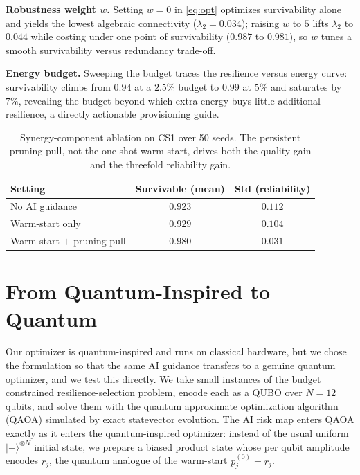 \documentclass[journal]{IEEEtran}
\begin{document}
\noindent\textbf{Robustness weight $w$.} Setting $w=0$ in \eqref{eq:opt} optimizes survivability alone and yields the lowest algebraic connectivity ($\lambda_2=0.034$); raising $w$ to $5$ lifts $\lambda_2$ to $0.044$ while costing under one point of survivability ($0.987$ to $0.981$), so $w$ tunes a smooth survivability versus redundancy trade-off.

\noindent\textbf{Energy budget.} Sweeping the budget traces the resilience versus energy curve: survivability climbs from $0.94$ at a $2.5\%$ budget to $0.99$ at $5\%$ and saturates by $7\%$, revealing the budget beyond which extra energy buys little additional resilience, a directly actionable provisioning guide.

\begin{table}[t]
\caption{Synergy-component ablation on CS1 over 50 seeds. The persistent pruning pull, not the one shot warm-start, drives both the quality gain and the threefold reliability gain.}
\label{tab:ablation}
\centering
\renewcommand{\arraystretch}{1.2}
\begin{tabular}{l c c}
\toprule
\textbf{Setting} & \textbf{Survivable (mean)} & \textbf{Std (reliability)} \\
\midrule
No AI guidance              & $0.923$ & $0.112$ \\
Warm-start only             & $0.929$ & $0.104$ \\
Warm-start $+$ pruning pull & $\mathbf{0.980}$ & $\mathbf{0.031}$ \\
\bottomrule
\end{tabular}
\end{table}

\section{From Quantum-Inspired to Quantum}\label{sec:quantum}

Our optimizer is quantum-inspired and runs on classical hardware, but we chose the formulation so that the same AI guidance transfers to a genuine quantum optimizer, and we test this directly. We take small instances of the budget constrained resilience-selection problem, encode each as a QUBO over $N=12$ qubits, and solve them with the quantum approximate optimization algorithm (QAOA) simulated by exact statevector evolution. The AI risk map enters QAOA exactly as it enters the quantum-inspired optimizer: instead of the usual uniform $|{+}\rangle^{\otimes N}$ initial state, we prepare a biased product state whose per qubit amplitude encodes $r_j$, the quantum analogue of the warm-start $p_j^{(0)}=r_j$.
\end{document}
